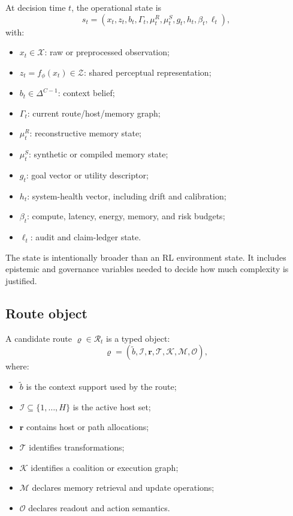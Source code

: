 \documentclass[10pt]{article}
\newcommand{\X}{\mathcal{X}}
\newcommand{\Rset}{\mathcal{R}}
\begin{document}
At decision time $t$, the operational state is
\begin{equation}
  s_t = (x_t,z_t,b_t,\Gamma_t,\mu_t^R,\mu_t^S,g_t,h_t,\beta_t,\ell_t),
  \label{eq:state}
\end{equation}
with:
\begin{itemize}
  \item $x_t\in\X$: raw or preprocessed observation;
  \item $z_t=f_\phi(x_t)\in\mathcal{Z}$: shared perceptual representation;
  \item $b_t\in\Delta^{C-1}$: context belief;
  \item $\Gamma_t$: current route/host/memory graph;
  \item $\mu_t^R$: reconstructive memory state;
  \item $\mu_t^S$: synthetic or compiled memory state;
  \item $g_t$: goal vector or utility descriptor;
  \item $h_t$: system-health vector, including drift and calibration;
  \item $\beta_t$: compute, latency, energy, memory, and risk budgets;
  \item $\ell_t$: audit and claim-ledger state.
\end{itemize}

The state is intentionally broader than an RL environment state. It includes epistemic and governance variables needed to decide how much complexity is justified.

\subsection{Route object}

A candidate route $\varrho\in\Rset_t$ is a typed object:
\begin{equation}
  \varrho=(\tilde b,\mathcal{I},\bm r,\mathcal{T},\mathcal{K},\mathcal{M},\mathcal{O}),
  \label{eq:routeobject}
\end{equation}
where:
\begin{itemize}
  \item $\tilde b$ is the context support used by the route;
  \item $\mathcal{I}\subseteq\{1,\ldots,H\}$ is the active host set;
  \item $\bm r$ contains host or path allocations;
  \item $\mathcal{T}$ identifies transformations;
  \item $\mathcal{K}$ identifies a coalition or execution graph;
  \item $\mathcal{M}$ declares memory retrieval and update operations;
  \item $\mathcal{O}$ declares readout and action semantics.
\end{itemize}
\end{document}
